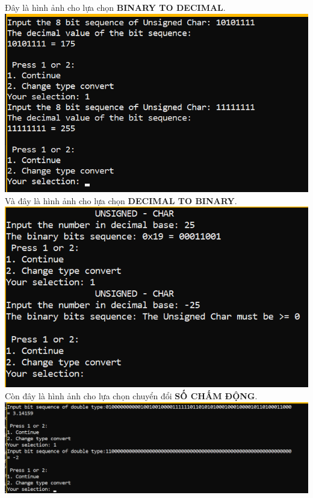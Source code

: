 \documentclass[12pt,a4paper]{article}
\begin{document}
\Large Đây là hình ảnh cho lựa chọn \textbf{BINARY TO DECIMAL}.\\
\includegraphics[scale=0.7]{picture/4.png} \\
\Large Và đây là hình ảnh cho lựa chọn \textbf{DECIMAL TO BINARY}. \\
\includegraphics[scale=0.7]{picture/5.png} \\
\Large Còn đây là hình ảnh cho lựa chọn chuyển đổi \textbf{SỐ CHẤM ĐỘNG}. \\
\includegraphics[scale=0.7]{picture/6.png} \\
\end{document}

